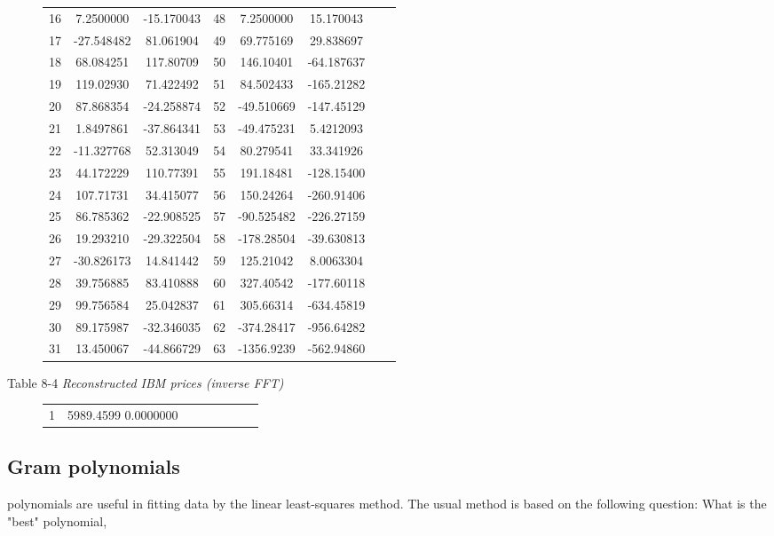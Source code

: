 \begin{figure}
\begin{tabular}{cccccccc}
        16 &  7.2500000 & -15.170043 & 48 &  7.2500000 &  15.170043 \\
        17 & -27.548482 &  81.061904 & 49 &  69.775169 &  29.838697 \\
        18 &  68.084251 &  117.80709 & 50 &  146.10401 & -64.187637 \\
        19 &  119.02930 &  71.422492 & 51 &  84.502433 & -165.21282 \\
        20 &  87.868354 & -24.258874 & 52 & -49.510669 & -147.45129 \\
        21 &  1.8497861 & -37.864341 & 53 & -49.475231 &  5.4212093 \\
        22 & -11.327768 &  52.313049 & 54 &  80.279541 &  33.341926 \\
        23 &  44.172229 &  110.77391 & 55 &  191.18481 & -128.15400 \\
        24 &  107.71731 &  34.415077 & 56 &  150.24264 & -260.91406 \\
        25 &  86.785362 & -22.908525 & 57 & -90.525482 & -226.27159 \\
        26 &  19.293210 & -29.322504 & 58 & -178.28504 & -39.630813 \\
        27 & -30.826173 &  14.841442 & 59 &  125.21042 &  8.0063304 \\
        28 &  39.756885 &  83.410888 & 60 &  327.40542 & -177.60118 \\
        29 &  99.756584 &  25.042837 & 61 &  305.66314 & -634.45819 \\
        30 &  89.175987 & -32.346035 & 62 & -374.28417 & -956.64282 \\
        31 &  13.450067 & -44.866729 & 63 & -1356.9239 & -562.94860 \\
    \end{tabular}
    \label{table:08_03}
\end{figure}

Table 8-4 \textit{Reconstructed IBM prices (inverse FFT)}
\begin{figure}
    \setlength{\tabcolsep}{1em}
    \begin{tabular}{cccccccc}
          1 &  5989.4599  0.0000000 
    \end{tabular}
    \label{table:08_04}
\end{figure}

\subsection{Gram polynomials}
 polynomials are useful in fitting data by the linear least-squares method. The usual method is based on the following question: What is the "best" polynomial,

